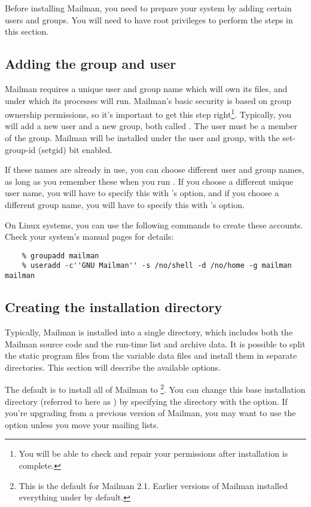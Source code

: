 \documentclass{howto}
\begin{document}
Before installing Mailman, you need to prepare your system by adding certain
users and groups.  You will need to have root privileges to perform the steps
in this section.

\subsection{Adding the group and user}

Mailman requires a unique user and group name which will own its files, and
under which its processes will run.  Mailman's basic security is based on
group ownership permissions, so it's important to get this step
right\footnote{You will be able to check and repair your permissions after
installation is complete.}.  Typically, you will add a new user and a new
group, both called .  The  user must be a member
of the  group.  Mailman will be installed under the
 user and group, with the set-group-id (setgid) bit enabled.

If these names are already in use, you can choose different user and group
names, as long as you remember these when you run .  If you
choose a different unique user name, you will have to specify this with
's  option, and if you choose
a different group name, you will have to specify this with
's  option.

On Linux systems, you can use the following commands to create these
accounts.  Check your system's manual pages for details:

\begin{verbatim}
    % groupadd mailman
    % useradd -c''GNU Mailman'' -s /no/shell -d /no/home -g mailman mailman
\end{verbatim}

\subsection{Creating the installation directory\label{create-install-dir}}
Typically, Mailman is installed into a single directory, which includes both
the Mailman source code and the run-time list and archive data.  It is
possible to split the static program files from the variable data files and
install them in separate directories.  This section will describe the
available options.

The default is to install all of Mailman to
\footnote{This is the default for Mailman 2.1.
Earlier versions of Mailman installed everything under  by
default.}.  You can change this base installation directory (referred to here
as ) by specifying the directory with the
  option.  If you're upgrading from
a previous version of Mailman, you may want to use the 
option unless you move your mailing lists.
\end{document}
